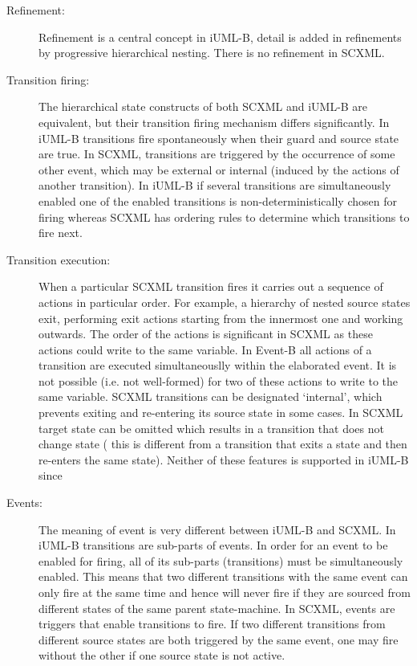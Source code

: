 \documentclass{easychair}
\begin{document}
\begin{description}
\item [Refinement:]
Refinement is a central concept in iUML-B, detail is 
added in refinements by progressive hierarchical 
nesting. There is no refinement in SCXML.

\item [Transition firing:]
The hierarchical state constructs of both SCXML and
iUML-B are equivalent, but their transition 
firing mechanism differs significantly. In iUML-B 
transitions fire spontaneously when their guard and source 
state are true. In SCXML, transitions are triggered by the 
occurrence of some other event, which may be external 
or internal (induced by the actions of another transition). 
In iUML-B if several transitions are simultaneously 
enabled one of the enabled transitions is non-deterministically 
chosen for firing whereas SCXML has ordering rules to 
determine which transitions to fire next.

\item [Transition execution:]
When a particular SCXML transition fires it carries out 
a sequence of actions in particular order. For example, 
a hierarchy of nested source states exit,
performing exit actions starting from the innermost 
one and working outwards. The order of the actions 
is significant in SCXML as these actions could 
write to the same variable. In Event-B all actions of a 
transition are executed simultaneouslly within the elaborated 
event. It is not possible (i.e. not well-formed) for two of these 
actions to write to the same variable.
SCXML transitions can be designated ‘internal’, which 
prevents exiting and re-entering its source state in 
some cases. In SCXML target state can be omitted which 
results in a transition that does not change state (
this is different from a transition that exits a state 
and then re-enters the same state).
Neither of these features is supported in iUML-B since 

\item [Events:]
The meaning of event is very different between iUML-B 
and SCXML. In iUML-B transitions are sub-parts of 
events. In order for an event to be enabled for firing, 
all of its sub-parts (transitions) must be 
simultaneously enabled. This means that two different 
transitions with the same event can only fire at the 
same time and hence will never fire if they are sourced 
from different states of the same parent state-machine. 
In SCXML, events are triggers that enable transitions 
to fire. If two different transitions from different 
source states are both triggered by the same event, one 
may fire without the other if one source state is not 
active.


\end{description}
\end{document}
